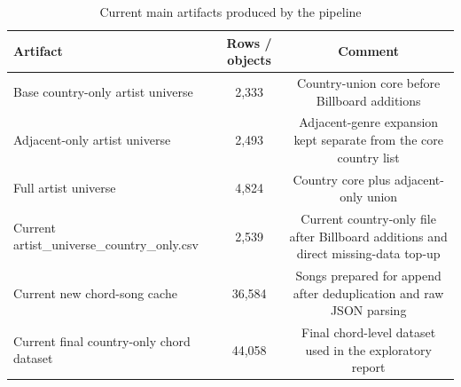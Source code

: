 \begin{table}[H]
\centering
\caption{Current main artifacts produced by the pipeline}
\label{tab:artifact_counts}
\begin{tabular}{lcc}
\toprule
Artifact & Rows / objects & Comment \\
\midrule
Base country-only artist universe & 2,333 & Country-union core before Billboard additions \\
Adjacent-only artist universe & 2,493 & Adjacent-genre expansion kept separate from the core country list \\
Full artist universe & 4,824 & Country core plus adjacent-only union \\
Current artist\_universe\_country\_only.csv & 2,539 & Current country-only file after Billboard additions and direct missing-data top-up \\
Current new chord-song cache & 36,584 & Songs prepared for append after deduplication and raw JSON parsing \\
Current final country-only chord dataset & 44,058 & Final chord-level dataset used in the exploratory report \\
\bottomrule
\end{tabular}
\end{table}

